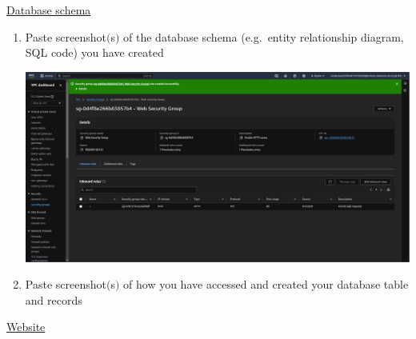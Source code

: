 \documentclass[11pt]{article}
\begin{document}
\vspace{1cm}

\newpage

\noindent\underline{Database schema}
\begin{enumerate}[resume]
    \item Paste screenshot$($s$)$ of the database schema (e.g.\ entity relationship diagram, SQL code) you have created \\ 
    \vspace{5mm}

    {\centering
    \includegraphics[width=5.8in]{pics/13.png}
    }

    \item Paste screenshot$($s$)$ of how you have accessed and created your database table and records \\
\end{enumerate}

\vspace{0.2cm}

\newpage
\noindent\underline{Website}
\end{document}
